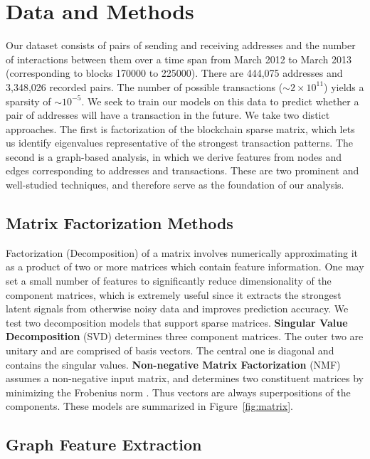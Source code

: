 \documentclass{article} %
\begin{document}
\section{Data and Methods}

Our dataset consists of pairs of sending and receiving addresses and the number of interactions between them over a time span from March 2012 to March 2013 (corresponding to blocks 170000 to 225000). There are 444,075 addresses and 3,348,026 recorded pairs. The number of possible transactions ($\sim 2 \times 10^{11}$) yields a sparsity of $\sim 10^{-5}$. We seek to train our models on this data to predict whether a pair of addresses will have a transaction in the future. We take two distict approaches. The first is factorization of the blockchain sparse matrix, which lets us identify eigenvalues representative of the strongest transaction patterns. The second is a graph-based analysis, in which we derive features from nodes and edges corresponding to addresses and transactions. These are two prominent and well-studied techniques, and therefore serve as the foundation of our analysis.

\subsection{Matrix Factorization Methods}

Factorization (Decomposition) of a matrix involves numerically approximating it as a product of two or more matrices which contain feature information. One may set a small number of features to significantly reduce dimensionality of the component matrices, which is extremely useful since it extracts the strongest latent signals from otherwise noisy data and improves prediction accuracy. We test two decomposition models that support sparse matrices. 
\textbf{Singular Value Decomposition} (SVD) determines three component matrices. The outer two are unitary and are comprised of basis vectors. The central one is diagonal and contains the singular values.
\textbf{Non-negative Matrix Factorization} (NMF) assumes a non-negative input matrix, and determines two constituent matrices by minimizing the Frobenius norm \cite{scikit-learn}. Thus vectors are always superpositions of the components. These models are summarized in Figure~\ref{fig:matrix}.

\subsection{Graph Feature Extraction}
\end{document}
